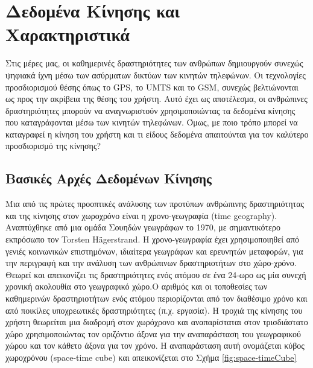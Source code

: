 \documentclass[12pt,twoside,openright]{report}
\begin{document}
\section[Δεδομένα Κίνησης και Χαρακτηριστικά]{Δεδομένα Κίνησης και Χαρακτηριστικά}
Στις μέρες μας, οι καθημερινές δραστηριότητες των ανθρώπων δημιουργούν συνεχώς ψηφιακά ίχνη μέσω των ασύρματων δικτύων των κινητών τηλεφώνων. Οι τεχνολογίες προσδιορισμού θέσης όπως το \lt GPS, \gt το \lt UMTS \gt και το \lt GSM, \gt συνεχώς βελτιώνονται ως προς την ακρίβεια της θέσης του χρήστη. Αυτό έχει ως αποτέλεσμα, οι ανθρώπινες δραστηριότητες μπορούν να αναγνωριστούν χρησιμοποιώντας τα δεδομένα κίνησης που καταγράφονται μέσω των κινητών τηλεφώνων. Όμως, με ποιο τρόπο μπορεί να καταγραφεί η κίνηση του χρήστη και τι είδους δεδομένα απαιτούνται για τον καλύτερο προσδιορισμό της κίνησης?

\subsection{Βασικές Αρχές Δεδομένων Κίνησης}

Μια από τις πρώτες προοπτικές ανάλυσης των προτύπων ανθρώπινης δραστηριότητας και της κίνησης στον χωροχρόνο είναι η χρονο-γεωγραφία \lt (time geography). \gt Αναπτύχθηκε από μια ομάδα Σουηδών γεωγράφων το 1970, με σημαντικότερο εκπρόσωπο τον \lt Torsten Hägerstrand. \gt Η χρονο-γεωγραφία έχει χρησιμοποιηθεί από γενιές κοινωνικών επιστημόνων, ιδιαίτερα γεωγράφων και ερευνητών μεταφορών, για την περιγραφή και την ανάλυση των ανθρώπινων δραστηριοτήτων στο χώρο-χρόνο. Θεωρεί και απεικονίζει τις δραστηριότητες ενός ατόμου σε ένα 24-ωρο ως μία συνεχή χρονική ακολουθία στο γεωγραφικό χώρο.Ο αριθμός και οι τοποθεσίες των καθημερινών δραστηριοτήτων ενός ατόμου περιορίζονται από τον διαθέσιμο χρόνο και από ποικίλες υποχρεωτικές δραστηριότητες (π.χ. εργασία).  Η τροχιά της κίνησης  του χρήστη θεωρείται μια διαδρομή στον χωρόχρονο και αναπαρίσταται στον τρισδιάστατο χώρο χρησιμοποιώντας τον οριζόντιο άξονα για την αναπαράσταση του γεωγραφικού χώρου και τον κάθετο άξονα για τον χρόνο. Η αναπαράσταση αυτή ονομάζεται κύβος χωροχρόνου \lt (space-time cube) \gt και απεικονίζεται στο Σχήμα \ref{fig:space-timeCube} \cite{giannotti2008mobility}\cite{geovisualization}
\end{document}
